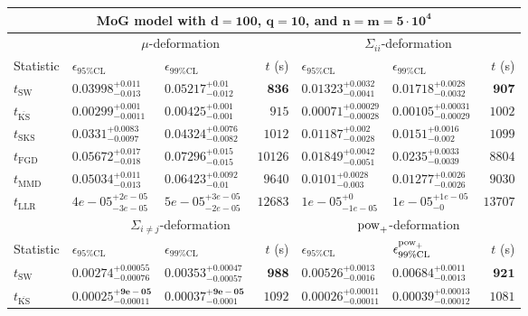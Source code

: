 \begin{tabular}{l|llr|llr}
	\toprule
	\multicolumn{7}{c}{{\bf MoG model with $\mathbf{d=100}$, $\mathbf{q=10}$, and $\mathbf{n=m=5\cdot 10^{4}}$}} \\
	\toprule
	\multicolumn{1}{c}{} & \multicolumn{3}{c}{$\mu$-deformation} & \multicolumn{3}{c}{$\Sigma_{ii}$-deformation} \\
	Statistic & $\epsilon_{95\%\mathrm{CL}}$ & $\epsilon_{99\%\mathrm    {CL}}$ & $t$ (s) & $\epsilon_{95\%\mathrm{CL}}$ & $\epsilon_{99\%\mathrm{CL}}$ & $t$ (s) \\
	\midrule
	$t_{\mathrm{SW}}$ & $0.03998_{-0.013}^{+0.011}$ & $0.05217_{-0.012}^{+0.01}$ & ${\mathbf{836}}$ & $0.01323_{-0.0041}^{+0.0032}$ & $0.01718_{-0.0032}^{+0.0028}$ & ${\mathbf{907}}$ \\
	$t_{\overline{\mathrm{KS}}}$ & ${\mathbf{0.00299_{-0.0011}^{+0.001}}}$ & ${\mathbf{0.00425_{-0.001}^{+0.001}}}$ & $915$ & ${\mathbf{0.00071_{-0.00028}^{+0.00029}}}$ & ${\mathbf{0.00105_{-0.00029}^{+0.00031}}}$ & $1002$ \\
	$t_{\mathrm{SKS}}$ & $0.0331_{-0.0097}^{+0.0083}$ & $0.04324_{-0.0082}^{+0.0076}$ & $1012$ & $0.01187_{-0.0028}^{+0.002}$ & $0.0151_{-0.002}^{+0.0016}$ & $1099$ \\
	$t_{\mathrm{FGD}}$ & $0.05672_{-0.018}^{+0.017}$ & $0.07296_{-0.015}^{+0.015}$ & $10126$ & $0.01849_{-0.0051}^{+0.0042}$ & $0.0235_{-0.0039}^{+0.0033}$ & $8804$ \\
	$t_{\mathrm{MMD}}$ & $0.05034_{-0.013}^{+0.011}$ & $0.06423_{-0.01}^{+0.0092}$ & $9640$ & $0.0101_{-0.003}^{+0.0028}$ & $0.01277_{-0.0026}^{+0.0026}$ & $9030$ \\
	$t_{\mathrm{LLR}}$ & $4e-05_{-3e-05}^{+2e-05}$ & $5e-05_{-2e-05}^{+3e-05}$ & $12683$ & $1e-05_{-1e-05}^{+0}$ & $1e-05_{-0}^{+1e-05}$ & $13707$ \\
	\toprule
	\multicolumn{1}{c}{} & \multicolumn{3}{c}{$\Sigma_{i\neq j}$-deformation} & \multicolumn{3}{c}{$\rm{pow}_{+}$-deformation} \\
	Statistic & $\epsilon_{95\%\mathrm{CL}}$ & $\epsilon_{99\%\mathrm{CL}}$ & $t$ (s) & $\epsilon_{95\%\mathrm{CL}}$ & $\epsilon^{\rm   {pow}_{+}}_{99\%\mathrm{CL}}$ & $t$ (s) \\
	\midrule
	$t_{\mathrm{SW}}$ & $0.00274_{-0.00076}^{+0.00055}$ & $0.00353_{-0.00057}^{+0.00047}$ & ${\mathbf{988}}$ & $0.00526_{-0.0016}^{+0.0013}$ & $0.00684_{-0.0013}^{+0.0011}$ & ${\mathbf{921}}$ \\
	$t_{\overline{\mathrm{KS}}}$ & ${\mathbf{0.00025_{-0.00011}^{+9e-05}}}$ & ${\mathbf{0.00037_{-0.0001}^{+9e-05}}}$ & $1092$ & ${\mathbf{0.00026_{-0.00011}^{+0.00011}}}$ & ${\mathbf{0.00039_{-0.00012}^{+0.00013}}}$ & $1081$ \\

\end{tabular}
